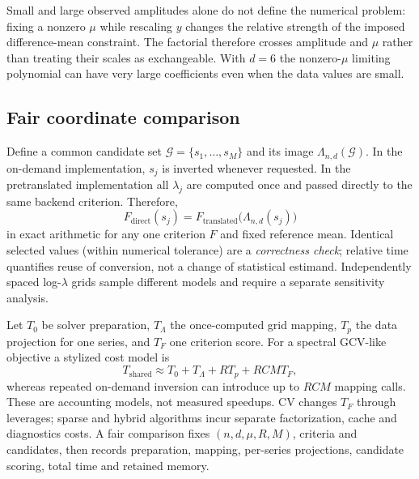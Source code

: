 Small and large observed amplitudes alone do not define the numerical problem: fixing a nonzero $\mu$ while rescaling $y$ changes the relative strength of the imposed difference-mean constraint. The factorial therefore crosses amplitude and $\mu$ rather than treating their scales as exchangeable. With $d=6$ the nonzero-$\mu$ limiting polynomial can have very large coefficients even when the data values are small.

\subsection{Fair coordinate comparison}
Define a common candidate set $\mathcal G=\{s_1,\ldots,s_M\}$ and its image $\Lambda_{n,d}(\mathcal G)$. In the on-demand implementation, $s_j$ is inverted whenever requested. In the pretranslated implementation all $\lambda_j$ are computed once and passed directly to the same backend criterion. Therefore,
\begin{equation}\label{eq:matched}
F_{\mathrm{direct}}(s_j)
=F_{\mathrm{translated}}\bigl(\Lambda_{n,d}(s_j)\bigr)
\end{equation}
in exact arithmetic for any one criterion $F$ and fixed reference mean. Identical selected values (within numerical tolerance) are a \emph{correctness check}; relative time quantifies reuse of conversion, not a change of statistical estimand. Independently spaced log-$\lambda$ grids sample different models and require a separate sensitivity analysis.

Let $T_0$ be solver preparation, $T_\Lambda$ the once-computed grid mapping, $T_p$ the data projection for one series, and $T_F$ one criterion score. For a spectral GCV-like objective a stylized cost model is
\begin{equation}\label{eq:amortized}
T_{\mathrm{shared}}\approx
T_0+T_\Lambda+R T_p+RCM T_F,
\end{equation}
whereas repeated on-demand inversion can introduce up to $RCM$ mapping calls. These are accounting models, not measured speedups. CV changes $T_F$ through leverages; sparse and hybrid algorithms incur separate factorization, cache and diagnostics costs. A fair comparison fixes $(n,d,\mu,R,M)$, criteria and candidates, then records preparation, mapping, per-series projections, candidate scoring, total time and retained memory.

